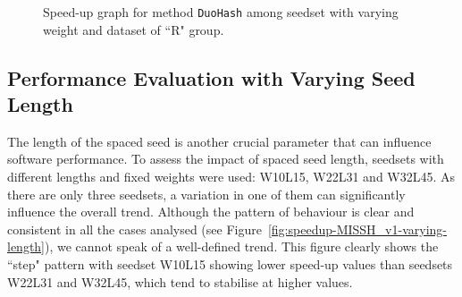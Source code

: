 	\begin{figure}[!ht]
		\centering
		\caption{Speed-up graph for method \texttt{DuoHash} among seedset with varying weight and dataset of “R" group.}
		\label{fig:speedup-MISSH_v1-varying-weight-R}
	\end{figure}




	\subsection{Performance Evaluation with Varying Seed Length}
	\label{subsec:performance-varying-seed-length}
	
	The length of the spaced seed is another crucial parameter that can influence software performance. To assess the impact of spaced seed length, seedsets with different lengths and fixed weights were used: W10L15, W22L31 and W32L45. As there are only three seedsets, a variation in one of them can significantly influence the overall trend. Although the pattern of behaviour is clear and consistent in all the cases analysed (see Figure~\ref{fig:speedup-MISSH_v1-varying-length}), we cannot speak of a well-defined trend. This figure clearly shows the “step" pattern with seedset W10L15 showing lower speed-up values than seedsets W22L31 and W32L45, which tend to stabilise at higher values.
	
